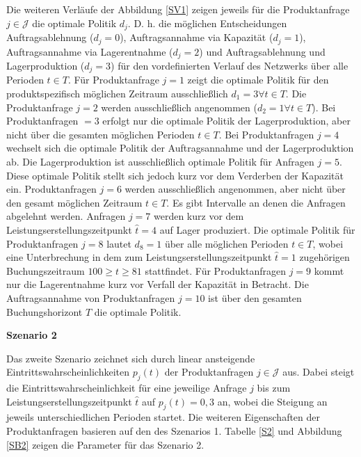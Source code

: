 Die weiteren Verläufe der Abbildung \ref{SV1} zeigen jeweils für die Produktanfrage $j\in\mathcal{J}$ die optimale Politik $d_j$. D. h. die möglichen Entscheidungen \glqq Auftragsablehnung ($d_j=0$){\grqq}, \glqq Auftragsannahme via Kapazität ($d_j=1$){\grqq}, \glqq Auftragsannahme via Lagerentnahme ($d_j=2$){\grqq} und \glqq Auftragsablehnung und Lagerproduktion ($d_j=3$){\grqq} für den vordefinierten Verlauf des Netzwerks über alle Perioden $t\in T$. Für Produktanfrage $j=1$ zeigt die optimale Politik für den produktspezifisch möglichen Zeitraum ausschließlich $d_1=3\forall t\in T$. Die Produktanfrage $j=2$ werden ausschließlich angenommen ($d_2=1\forall t \in T$). Bei Produktanfragen $=3$ erfolgt nur die optimale Politik der Lagerproduktion, aber nicht über die gesamten möglichen Perioden $t\in T$. Bei Produktanfragen $j=4$ wechselt sich die optimale Politik  der Auftragsannahme und der Lagerproduktion ab. Die Lagerproduktion ist ausschließlich optimale Politik für Anfragen $j=5$. Diese optimale Politik stellt sich jedoch kurz vor dem Verderben der Kapazität ein. Produktanfragen $j=6$ werden ausschließlich angenommen, aber nicht über den gesamt möglichen Zeitraum $t\in T$. Es gibt Intervalle an denen die Anfragen abgelehnt werden. Anfragen $j=7$ werden kurz vor dem Leistungserstellungszeitpunkt $\hat t=4$ auf Lager produziert. Die optimale Politik für Produktanfragen $j=8$ lautet $d_8=1$ über alle möglichen Perioden $t\in T$, wobei eine Unterbrechung in dem zum Leistungserstellungszeitpunkt $\hat t=1$ zugehörigen Buchungszeitraum $100\ge t \ge 81$ stattfindet. Für Produktanfragen $j=9$ kommt nur die Lagerentnahme kurz vor Verfall der Kapazität in Betracht. Die Auftragsannahme von Produktanfragen $j=10$ ist über den gesamten Buchungshorizont $T$ die optimale Politik.

\textbf{Szenario 2}

Das zweite Szenario zeichnet sich durch linear ansteigende Eintrittswahrscheinlichkeiten $p_j(t)$ der Produktanfragen $j\in\mathcal{J}$ aus. Dabei steigt die Eintrittswahrscheinlichkeit für eine jeweilige Anfrage $j$ bis zum Leistungserstellungszeitpunkt $\hat t$ auf $p_j(t)=0,3$ an, wobei die Steigung an jeweils unterschiedlichen Perioden startet. Die weiteren Eigenschaften der Produktanfragen basieren auf den des Szenarios 1. Tabelle \ref{S2} und Abbildung \ref{SB2} zeigen die Parameter für das Szenario 2.

